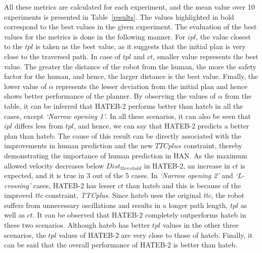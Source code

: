 All these metrics are calculated for each experiment, and the mean value over 10 experiments is presented in Table~\ref{results}. The values highlighted in bold correspond to the best values in the given experiment. The evaluation of the best values for the metrics is done in the following manner. For $ipl$, the value closest to the $tpl$ is taken as the best value, as it suggests that the initial plan is very close to the traversed path. In case of $tpl$ and $ct$, smaller value represents the best value. The greater the distance of the robot from the human, the more the safety factor for the human, and hence, the larger distance is the best value. Finally, the lower value of $\alpha$ represents the lesser deviation from the initial plan and hence shows better performance of the planner. By observing the values of $\alpha$ from the table, it can be inferred that HATEB-2 performs better than \acrshort{hateb} in all the cases, except \textit{`Narrow opening 1'}. In all these scenarios, it can also be seen that $ipl$ differs less from $tpl$, and hence, we can say that HATEB-2 predicts a better plan than \acrshort{hateb}. The cause of this result can be directly associated with the improvements in human prediction and the new $TTCplus$ constraint, thereby demonstrating the importance of human prediction in HAN. As the maximum allowed velocity decreases below $Dist_{threshold}$ in HATEB-2, an increase in $ct$ is expected, and it is true in 3 out of the 5 cases. In \textit{`Narrow opening 2'} and  \textit{`L-crossing'} cases, HATEB-2 has lesser $ct$ than \acrshort{hateb} and this is because of the improved \textit{\acrshort{ttc}} constraint, \textit{TTCplus}. Since \acrshort{hateb} uses the original \textit{\acrshort{ttc}}, the robot suffers from unnecessary oscillations and results in a longer path length, $tpl$ as well as $ct$. It can be observed that HATEB-2 completely outperforms \acrshort{hateb} in these two scenarios. Although \acrshort{hateb} has better $tpl$ values in the other three scenarios, the $tpl$ values of HATEB-2 are very close to those of \acrshort{hateb}. Finally, it can be said that the overall performance of HATEB-2 is better than \acrshort{hateb}.

